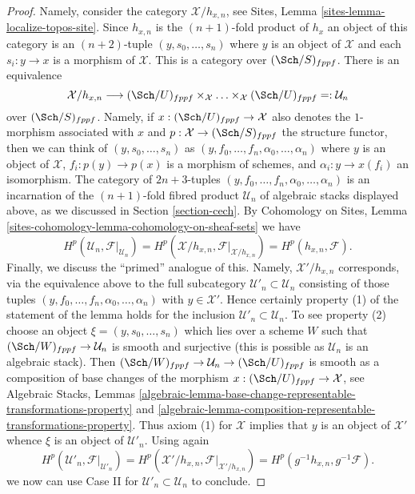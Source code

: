 \begin{proof}
\medskip\noindent
Namely, consider the category $\mathcal{X}/h_{x, n}$, see
Sites, Lemma \ref{sites-lemma-localize-topos-site}.
Since $h_{x, n}$ is the $(n + 1)$-fold product of $h_x$ an
object of this category is an $(n + 2)$-tuple
$(y, s_0, \ldots, s_n)$ where $y$ is an object of $\mathcal{X}$ and each
$s_i : y \to x$ is a morphism of $\mathcal{X}$.
This is a category over $(\Sch/S)_{fppf}$. There is an equivalence
$$
\mathcal{X}/h_{x, n}
\longrightarrow
(\Sch/U)_{fppf} \times_\mathcal{X} \ldots \times_\mathcal{X} (\Sch/U)_{fppf}
=: \mathcal{U}_n
$$
over $(\Sch/S)_{fppf}$. Namely, if $x : (\Sch/U)_{fppf} \to \mathcal{X}$ also
denotes the $1$-morphism associated with $x$ and
$p : \mathcal{X} \to (\Sch/S)_{fppf}$ the structure functor,
then we can think of $(y, s_0, \ldots, s_n)$ as
$(y, f_0, \ldots, f_n, \alpha_0, \ldots, \alpha_n)$
where $y$ is an object of $\mathcal{X}$, $f_i : p(y) \to p(x)$ is a
morphism of schemes, and $\alpha_i : y \to x(f_i)$ an isomorphism.
The category of $2n+3$-tuples
$(y, f_0, \ldots, f_n, \alpha_0, \ldots, \alpha_n)$
is an incarnation of the $(n + 1)$-fold fibred product $\mathcal{U}_n$
of algebraic stacks displayed above, as we discussed in
Section \ref{section-cech}.
By Cohomology on Sites, Lemma
\ref{sites-cohomology-lemma-cohomology-on-sheaf-sets}
we have
$$
H^p(\mathcal{U}_n, \mathcal{F}|_{\mathcal{U}_n}) =
H^p(\mathcal{X}/h_{x, n}, \mathcal{F}|_{\mathcal{X}/h_{x, n}}) =
H^p(h_{x, n}, \mathcal{F}).
$$
Finally, we discuss the ``primed'' analogue of this. Namely,
$\mathcal{X}'/h_{x, n}$ corresponds, via the equivalence above
to the full subcategory $\mathcal{U}'_n \subset \mathcal{U}_n$
consisting of those tuples
$(y, f_0, \ldots, f_n, \alpha_0, \ldots, \alpha_n)$
with $y \in \mathcal{X}'$. Hence certainly property (1) of the
statement of the lemma holds
for the inclusion $\mathcal{U}'_n \subset \mathcal{U}_n$.
To see property (2) choose an object $\xi = (y, s_0, \ldots, s_n)$ which
lies over a scheme $W$ such that $(\Sch/W)_{fppf} \to \mathcal{U}_n$
is smooth and surjective (this is possible as $\mathcal{U}_n$ is
an algebraic stack). Then
$(\Sch/W)_{fppf} \to \mathcal{U}_n \to (\Sch/U)_{fppf}$
is smooth as a composition of base changes of the morphism
$x : (\Sch/U)_{fppf} \to \mathcal{X}$, see
Algebraic Stacks, Lemmas
\ref{algebraic-lemma-base-change-representable-transformations-property} and
\ref{algebraic-lemma-composition-representable-transformations-property}.
Thus axiom (1) for $\mathcal{X}$ implies that $y$ is an object of
$\mathcal{X}'$ whence $\xi$ is an object of $\mathcal{U}'_n$.
Using again
$$
H^p(\mathcal{U}'_n, \mathcal{F}|_{\mathcal{U}'_n}) =
H^p(\mathcal{X}'/h_{x, n}, \mathcal{F}|_{\mathcal{X}'/h_{x, n}}) =
H^p(g^{-1}h_{x, n}, g^{-1}\mathcal{F}).
$$
we now can use Case II for 
$\mathcal{U}'_n \subset \mathcal{U}_n$
to conclude.
\end{proof}








